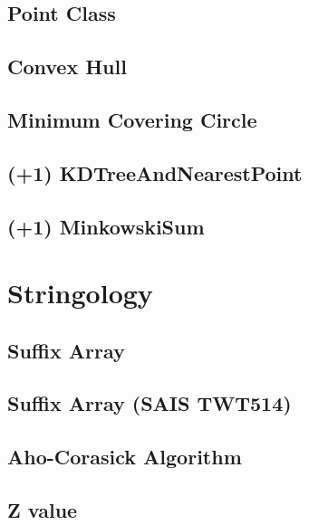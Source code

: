 \documentclass[10pt,twocolumn,oneside]{article}
\begin{document}
\subsection{Point Class}


\subsection{Convex Hull}


\subsection{Minimum Covering Circle}


\subsection{(+1) KDTreeAndNearestPoint}


\subsection{(+1) MinkowskiSum}


\section{Stringology}
\subsection{Suffix Array}


\subsection{Suffix Array (SAIS TWT514)}


\subsection{Aho-Corasick Algorithm}


\subsection{Z value}

\end{document}

